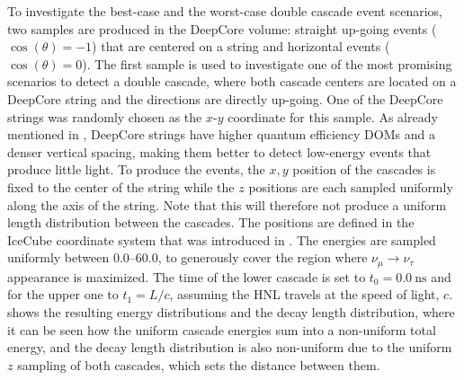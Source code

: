 

To investigate the best-case and the worst-case double cascade event scenarios, two samples are produced in the DeepCore volume: straight up-going events ($\cos(\theta)=-1$) that are centered on a string and horizontal events ($\cos(\theta)=0$). The first sample is used to investigate one of the most promising scenarios to detect a double cascade, where both cascade centers are located on a DeepCore string and the directions are directly up-going. One of the DeepCore strings was randomly chosen as the $x$-$y$ coordinate for this sample. 
As already mentioned in , DeepCore strings have higher quantum efficiency DOMs and a denser vertical spacing, making them better to detect low-energy events that produce little light. To produce the events, the $x,y$ position of the cascades is fixed to the center of the string while the $z$ positions are each sampled uniformly along the axis of the string. Note that this will therefore not produce a uniform length distribution between the cascades. The positions are defined in the IceCube coordinate system that was introduced in . The energies are sampled uniformly between \SIrange[range-phrase={~and~}]{0.0}{60.0}{\gev}, to generously cover the region where $\nu_\mu\rightarrow\nu_\tau$ appearance is maximized. The time of the lower cascade is set to $t_0=\SI{0.0}{\nano\second}$ and for the upper one to $t_1=L/c$, assuming the HNL travels at the speed of light, $c$.  shows the resulting energy distributions and the decay length distribution, where it can be seen how the uniform cascade energies sum into a non-uniform total energy, and the decay length distribution is also non-uniform due to the uniform $z$ sampling of both cascades, which sets the distance between them.

